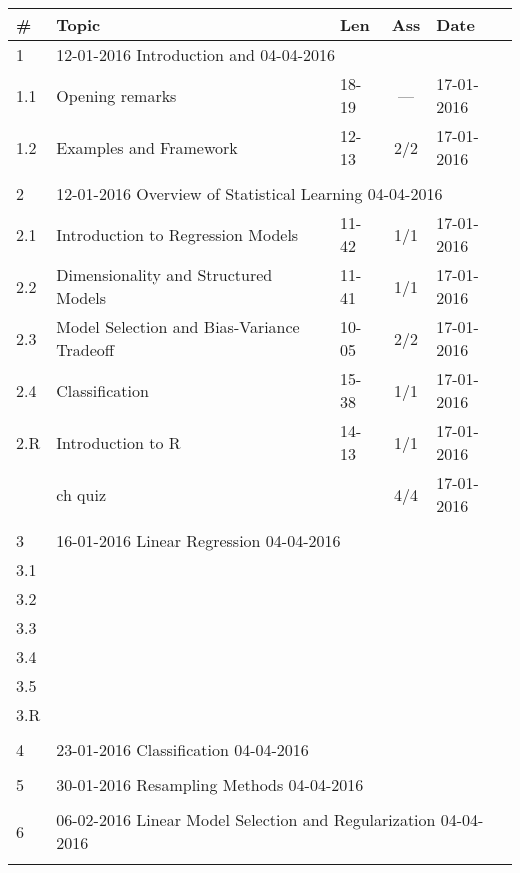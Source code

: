 \documentclass[a4paper,12pt]{article} %
\begin{document}
\begin{longtable}{|l|p{11cm}|l|c|l|}
	\hline
	\# & Topic & Len & Ass & Date \\
	\hline
	1 & \multicolumn{4}{|l|}{12-01-2016 \hfill Introduction and  \hfill 04-04-2016}\\
	\hline
	1.1 & Opening remarks & 18-19 & --- & 17-01-2016 \\
	\hline
	1.2 & Examples and Framework & 12-13 & 2/2 & 17-01-2016 \\
	\hline
	& & & &  \\
	\hline
	2 & \multicolumn{4}{|l|}{12-01-2016 \hfill Overview of Statistical Learning \hfill 04-04-2016}\\
	\hline
	2.1 & Introduction to Regression Models & 11-42 & 1/1 & 17-01-2016 \\
	\hline
	2.2 & Dimensionality and Structured Models & 11-41 & 1/1 & 17-01-2016 \\
	\hline
	2.3 & Model Selection and Bias-Variance Tradeoff & 10-05 & 2/2 & 17-01-2016 \\
	\hline
	2.4 & Classification & 15-38 & 1/1 & 17-01-2016 \\
	\hline
	2.R & Introduction to R & 14-13 & 1/1 & 17-01-2016 \\
	\hline
	& ch quiz & & 4/4 & 17-01-2016 \\
	\hline
	& & & &  \\
	\hline
	3 & \multicolumn{4}{|l|}{16-01-2016 \hfill Linear Regression \hfill 04-04-2016}\\
	\hline
	3.1 & & & &  \\
	\hline
	3.2 & & & &  \\
	\hline
	3.3 & & & &  \\
	\hline
	3.4 & & & &  \\
	\hline
	3.5 & & & &  \\
	\hline
	3.R & & & &  \\
	\hline
	& & & &  \\
	\hline
	4 & \multicolumn{4}{|l|}{23-01-2016 \hfill Classification \hfill 04-04-2016}\\
	\hline
	& & & &  \\
	\hline
	5 & \multicolumn{4}{|l|}{30-01-2016 \hfill Resampling Methods \hfill 04-04-2016}\\
	\hline
	& & & &  \\
	\hline
	6 & \multicolumn{4}{|l|}{06-02-2016 \hfill Linear Model Selection and Regularization \hfill 04-04-2016}\\
	\hline
	& & & &  \\

\end{longtable}
\end{document}
